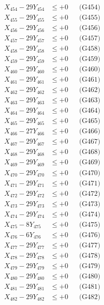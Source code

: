 \documentclass[a4paper,10pt]{article}
\begin{document}
{\begin{align}
X_{454} - 29Y_{454} &\leq +0 && \text{(G454)} \\
X_{455} - 29Y_{455} &\leq +0 && \text{(G455)} \\
X_{456} - 29Y_{456} &\leq +0 && \text{(G456)} \\
X_{457} - 29Y_{457} &\leq +0 && \text{(G457)} \\
X_{458} - 29Y_{458} &\leq +0 && \text{(G458)} \\
X_{459} - 29Y_{459} &\leq +0 && \text{(G459)} \\
X_{460} - 29Y_{460} &\leq +0 && \text{(G460)} \\
\allowbreak
X_{461} - 29Y_{461} &\leq +0 && \text{(G461)} \\
X_{462} - 29Y_{462} &\leq +0 && \text{(G462)} \\
X_{463} - 29Y_{463} &\leq +0 && \text{(G463)} \\
X_{464} - 29Y_{464} &\leq +0 && \text{(G464)} \\
X_{465} - 29Y_{465} &\leq +0 && \text{(G465)} \\
X_{466} - 27Y_{466} &\leq +0 && \text{(G466)} \\
X_{467} - 29Y_{467} &\leq +0 && \text{(G467)} \\
X_{468} - 29Y_{468} &\leq +0 && \text{(G468)} \\
X_{469} - 29Y_{469} &\leq +0 && \text{(G469)} \\
X_{470} - 29Y_{470} &\leq +0 && \text{(G470)} \\
\allowbreak
X_{471} - 29Y_{471} &\leq +0 && \text{(G471)} \\
X_{472} - 29Y_{472} &\leq +0 && \text{(G472)} \\
X_{473} - 29Y_{473} &\leq +0 && \text{(G473)} \\
X_{474} - 29Y_{474} &\leq +0 && \text{(G474)} \\
X_{475} - 8Y_{475} &\leq +0 && \text{(G475)} \\
X_{476} - 6Y_{476} &\leq +0 && \text{(G476)} \\
X_{477} - 29Y_{477} &\leq +0 && \text{(G477)} \\
X_{478} - 29Y_{478} &\leq +0 && \text{(G478)} \\
X_{479} - 29Y_{479} &\leq +0 && \text{(G479)} \\
X_{480} - 29Y_{480} &\leq +0 && \text{(G480)} \\
\allowbreak
X_{481} - 29Y_{481} &\leq +0 && \text{(G481)} \\
X_{482} - 29Y_{482} &\leq +0 && \text{(G482)} \\

\end{align}}
\end{document}
